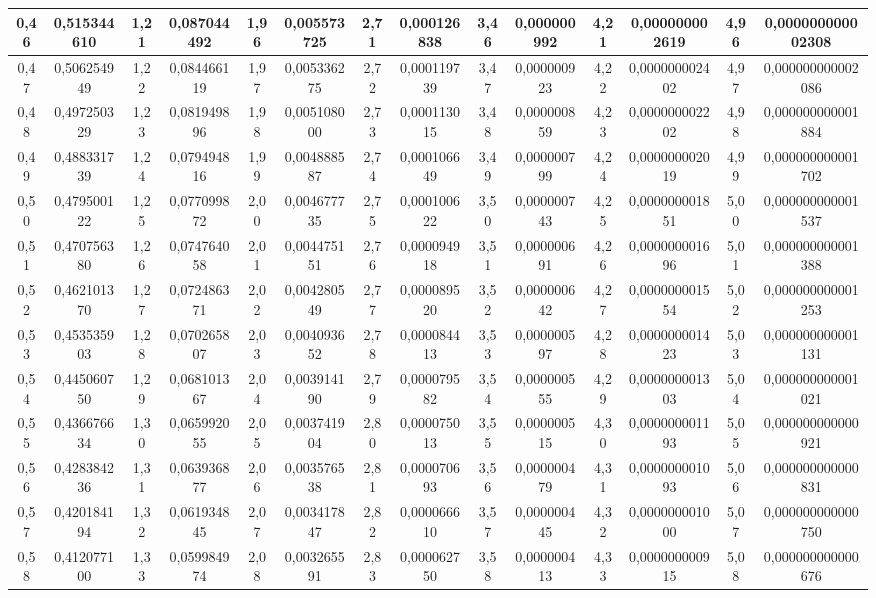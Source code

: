 \documentclass[a4paper,8pt]{article}
\begin{document}
\begin{table}[!ht]
{\begin{tabular}{|c|c||c|c||c|c||c|c||c|c||c|c||c|c||}
        0,46 & 0,515344610 & 1,21 & 0,087044492 & 1,96 & 0,005573725 & 2,71 & 0,000126838 & 3,46 & 0,000000992 & 4,21 & 0,000000002619 & 4,96 & 0,000000000002308 \\ \hline
        0,47 & 0,506254949 & 1,22 & 0,084466119 & 1,97 & 0,005336275 & 2,72 & 0,000119739 & 3,47 & 0,000000923 & 4,22 & 0,000000002402 & 4,97 & 0,000000000002086 \\ \hline
        0,48 & 0,497250329 & 1,23 & 0,081949896 & 1,98 & 0,005108000 & 2,73 & 0,000113015 & 3,48 & 0,000000859 & 4,23 & 0,000000002202 & 4,98 & 0,000000000001884 \\ \hline
        0,49 & 0,488331739 & 1,24 & 0,079494816 & 1,99 & 0,004888587 & 2,74 & 0,000106649 & 3,49 & 0,000000799 & 4,24 & 0,000000002019 & 4,99 & 0,000000000001702 \\ \hline
        0,50 & 0,479500122 & 1,25 & 0,077099872 & 2,00 & 0,004677735 & 2,75 & 0,000100622 & 3,50 & 0,000000743 & 4,25 & 0,000000001851 & 5,00 & 0,000000000001537 \\ \hline
        0,51 & 0,470756380 & 1,26 & 0,074764058 & 2,01 & 0,004475151 & 2,76 & 0,000094918 & 3,51 & 0,000000691 & 4,26 & 0,000000001696 & 5,01 & 0,000000000001388 \\ \hline
        0,52 & 0,462101370 & 1,27 & 0,072486371 & 2,02 & 0,004280549 & 2,77 & 0,000089520 & 3,52 & 0,000000642 & 4,27 & 0,000000001554 & 5,02 & 0,000000000001253 \\ \hline
        0,53 & 0,453535903 & 1,28 & 0,070265807 & 2,03 & 0,004093652 & 2,78 & 0,000084413 & 3,53 & 0,000000597 & 4,28 & 0,000000001423 & 5,03 & 0,000000000001131 \\ \hline
        0,54 & 0,445060750 & 1,29 & 0,068101367 & 2,04 & 0,003914190 & 2,79 & 0,000079582 & 3,54 & 0,000000555 & 4,29 & 0,000000001303 & 5,04 & 0,000000000001021 \\ \hline
        0,55 & 0,436676634 & 1,30 & 0,065992055 & 2,05 & 0,003741904 & 2,80 & 0,000075013 & 3,55 & 0,000000515 & 4,30 & 0,000000001193 & 5,05 & 0,000000000000921 \\ \hline
        0,56 & 0,428384236 & 1,31 & 0,063936877 & 2,06 & 0,003576538 & 2,81 & 0,000070693 & 3,56 & 0,000000479 & 4,31 & 0,000000001093 & 5,06 & 0,000000000000831 \\ \hline
        0,57 & 0,420184194 & 1,32 & 0,061934845 & 2,07 & 0,003417847 & 2,82 & 0,000066610 & 3,57 & 0,000000445 & 4,32 & 0,000000001000 & 5,07 & 0,000000000000750 \\ \hline
        0,58 & 0,412077100 & 1,33 & 0,059984974 & 2,08 & 0,003265591 & 2,83 & 0,000062750 & 3,58 & 0,000000413 & 4,33 & 0,000000000915 & 5,08 & 0,000000000000676 \\ \hline

\end{tabular}}
\end{table}
\end{document}
